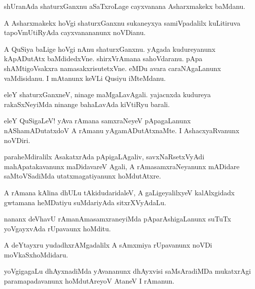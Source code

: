 \documentclass{article}
\begin{document}
\begin{mn}%
shUranAda  shaturxGanxnu aSaTxroLage cayxvanana Asharxmakekx baMdanu.
\end{mn}

\begin{mn}%
A Asharxmakekx hoVgi shaturxGanxnu sukaneyxya samiVpadalilx kuLitiruva tapoVmUtiRyAda 
cayxvanananunx noVDianu. 
\end{mn}

\begin{mn}%
A QuSiya baLige hoVgi nAnu shaturxGanxnu. yAgada kudureyanunx kApADutAtx baMdidedxVne. 
shirxVrAmana sahoVdaranu. pApa shAMtigoVsakxra namasakxrisutetxVne. eMDu avara 
caraNAgaLanunx vaMdisidanu. I mAtanunx keVLi Qusiyu iMteMdanu.
\end{mn}

\begin{mn}%
eleY shaturxGanxneV, ninage maMgaLavAgali. yajacnxda kudureya rakaSxNeyiMda ninange 
bahaLavAda kiVtiRyu barali.
\end{mn}

\begin{mn}%
eleY QuSigaLeV! yAva rAmana samxraNeyeV pApagaLanunx nAShamADutatxdoV A rAmanu 
yAgamADutAtxnaMte. I AshacxyaRvanunx noVDiri.
\end{mn}

\begin{mn}%
paraheMdiralilx AsakatxrAda pApigaLAgaliv, savxNaRsetxVyAdi mahApatakavanunx maDidavareV 
Agali, A rAmasamxraNeyanunx mADidare saMtoVSadiMda utatxmagatiyanunx hoMdutAtxre.
\end{mn}

\begin{mn}%
A rAmana kAlina dhULu tAkidudaridaleV, A gaLigeyalilxyeV kalAlxgidadx gwtamana heMDatiyu 
suMdariyAda sitxrXVyAdaLu. 
\end{mn}

\begin{mn}%
nananx deVhavU rAmanAmasamxraneyiMda pAparAshigaLanunx suTuTx yoVgayxvAda rUpavaunx hoMditu.
\end{mn}

\begin{mn}%
A deYtayxru yudadhxrAMgadalilx A sAmxmiya rUpavanunx noVDi moVkaSxhoMdidaru.
\end{mn}

\begin{mn}%
yoVgigagaLu dhAyxnadiMda yAvananunx dhAyxvisi saMsAradiMDa mukatxrAgi paramapadavanunx 
hoMdutAreyoV AtaneV I rAmanun.
\end{mn}
\end{document}
